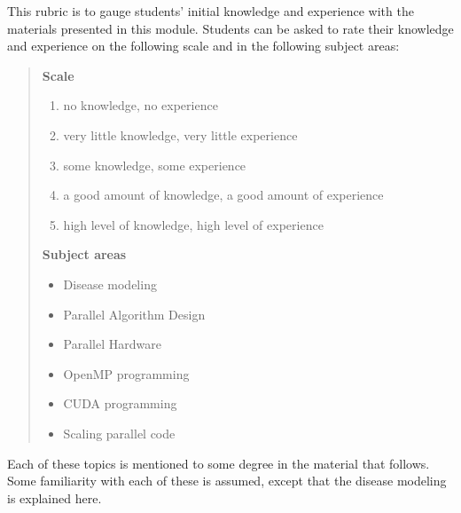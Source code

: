 \documentclass[letterpaper,10pt,openany,oneside]{sphinxmanual}
\begin{document}
This rubric is to gauge students’ initial knowledge and experience with
the materials presented in this module. Students can be asked to rate their
knowledge and experience on the following scale and in the following
subject areas:
\begin{quote}

\textbf{Scale}
\begin{enumerate}
\item {} 
no knowledge, no experience

\item {} 
very little knowledge, very little experience

\item {} 
some knowledge, some experience

\item {} 
a good amount of knowledge, a good amount of experience

\item {} 
high level of knowledge, high level of experience

\end{enumerate}

\textbf{Subject areas}
\begin{itemize}
\item {} 
Disease modeling

\item {} 
Parallel Algorithm Design

\item {} 
Parallel Hardware

\item {} 
OpenMP programming

\item {} 
CUDA programming

\item {} 
Scaling parallel code

\end{itemize}
\end{quote}

Each of these topics is mentioned to some degree in the material that follows. Some familiarity with each of these is assumed, except that the disease modeling is explained here.
\end{document}

